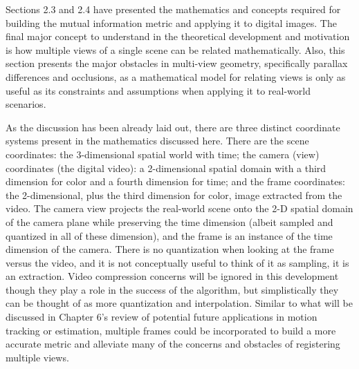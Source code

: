 %
%
%
%
%
%
%
%
%

%
%
%



Sections 2.3 and 2.4 have presented the mathematics and concepts required for building the mutual information metric and applying it to digital images. The final major concept to understand in the theoretical development and motivation is how multiple views of a single scene can be related mathematically. Also, this section presents the major obstacles in multi-view geometry, specifically parallax differences and occlusions, as a mathematical model for relating views is only as useful as its constraints and assumptions when applying it to real-world scenarios.

As the discussion has been already laid out, there are three distinct coordinate systems present in the mathematics discussed here. There are the scene coordinates: the 3-dimensional spatial world with time; the camera (view) coordinates (the digital video): a 2-dimensional spatial domain with a third dimension for color and a fourth dimension for time; and the frame coordinates: the 2-dimensional, plus the third dimension for color, image extracted from the video. The camera view projects the real-world scene onto the 2-D spatial domain of the camera plane while preserving the time dimension (albeit sampled and quantized in all of these dimension), and the frame is an instance of the time dimension of the camera. There is no quantization when looking at the frame versus the video, and it is not conceptually useful to think of it as sampling, it is an extraction. Video compression concerns will be ignored in this development though they play a role in the success of the algorithm, but simplistically they can be thought of as  more quantization and interpolation. Similar to what will be discussed in Chapter 6's review of potential future applications in motion tracking or estimation, multiple frames could be incorporated to build a more accurate metric and alleviate many of the concerns and obstacles of registering multiple views.


